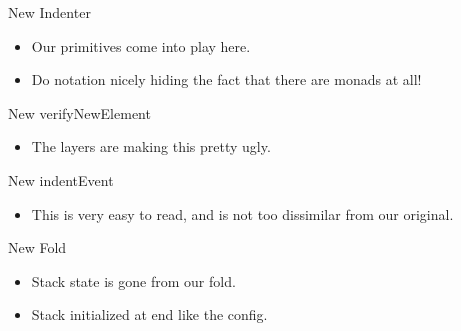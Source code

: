 \documentclass[professionalFonts,aspectratio=169]{beamer}
\begin{document}
\begin{frame}{New Indenter}



\begin{itemize}
\item Our primitives come into play here.
\pause \item Do notation nicely hiding the fact that there are monads at all!
\end{itemize}

\end{frame}

\begin{frame}{New verifyNewElement}



\begin{itemize}
\item The layers are making this pretty ugly.
\end{itemize}

\end{frame}

\begin{frame}{New indentEvent}



\begin{itemize}
\item This is very easy to read, and is not too dissimilar from our original.
\end{itemize}

\end{frame}

\begin{frame}{New Fold}



\begin{itemize}
\item Stack state is gone from our fold. 
\item Stack initialized at end like the config.
\end{itemize}

\end{frame}
\end{document}

